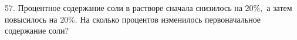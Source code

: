 57. Процентное содержание соли в растворе сначала снизилось на $20\%,$ а затем повысилось на $20\%.$ На сколько процентов изменилось первоначальное содержание соли?\\

